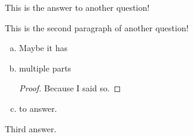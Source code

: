 \begin{answer}{2}
This is the answer to another question!

This is the second paragraph of another question!

\begin{enumerate}[a.]
    \item Maybe it has\textellipsis{}
    \item \textellipsis{}multiple parts\textellipsis{}
        \begin{proof}
            Because I said so.
        \end{proof}
    \item \textellipsis{}to answer.
\end{enumerate}

\end{answer}



\begin{answer}{3}
Third answer.
\end{answer}





